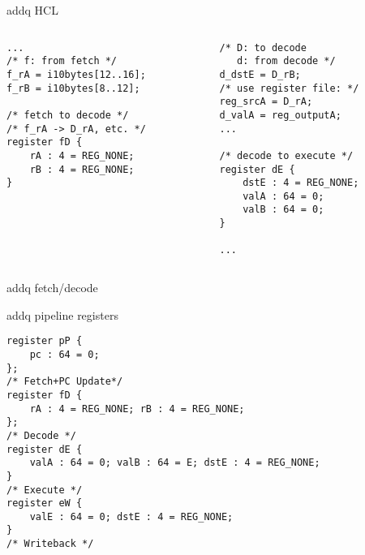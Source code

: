 \begin{frame}[fragile,label=addqHcl]{addq HCL}
\lstset{language=C,style=small}
\begin{columns}
\begin{column}{0.5\textwidth}
\begin{lstlisting}
...
/* f: from fetch */
f_rA = i10bytes[12..16];
f_rB = i10bytes[8..12];

/* fetch to decode */
/* f_rA -> D_rA, etc. */
register fD {
    rA : 4 = REG_NONE;
    rB : 4 = REG_NONE;
}

\end{lstlisting}
\end{column}
\begin{column}{0.5\textwidth}
\begin{lstlisting}
/* D: to decode 
   d: from decode */
d_dstE = D_rB;
/* use register file: */
reg_srcA = D_rA; 
d_valA = reg_outputA; 
...

/* decode to execute */
register dE {
    dstE : 4 = REG_NONE;
    valA : 64 = 0;
    valB : 64 = 0;
}

...
\end{lstlisting}
\end{column}
\end{columns}
\end{frame}

\begin{frame}[fragile,label=hcl2DStageCode]{addq fetch/decode}
\end{frame}

\begin{frame}[fragile,label=hcl2DPipe]{addq pipeline registers}
\begin{Verbatim}[fontsize=\fontsize{10}{11}\selectfont]
register pP {
    pc : 64 = 0;
};
/* Fetch+PC Update*/
register fD {
    rA : 4 = REG_NONE; rB : 4 = REG_NONE;
};
/* Decode */
register dE {
    valA : 64 = 0; valB : 64 = E; dstE : 4 = REG_NONE;
}
/* Execute */
register eW {
    valE : 64 = 0; dstE : 4 = REG_NONE;
}
/* Writeback */
\end{Verbatim}
\end{frame}

